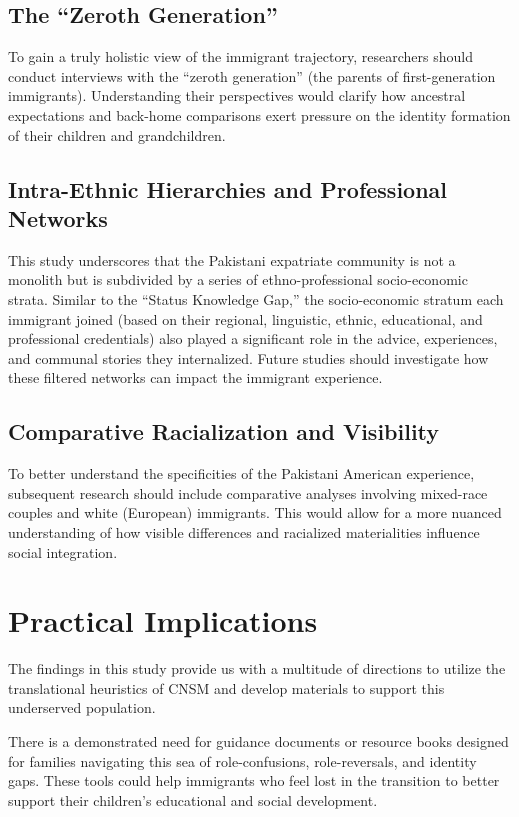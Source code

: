 \subsection{The ``Zeroth Generation''}

To gain a truly holistic view of the immigrant trajectory, researchers should conduct interviews with the “zeroth generation” (the parents of first-generation immigrants). Understanding their perspectives would clarify how ancestral expectations and back-home comparisons exert pressure on the identity formation of their children and grandchildren.

\subsection{Intra-Ethnic Hierarchies and Professional Networks}

This study underscores that the Pakistani expatriate community is not a monolith but is subdivided by a series of ethno-professional socio-economic strata. Similar to the “Status Knowledge Gap,” the socio-economic stratum each immigrant joined (based on their regional, linguistic, ethnic, educational, and professional credentials) also played a significant role in the advice, experiences, and communal stories they internalized. Future studies should investigate how these filtered networks can impact the immigrant experience.

\subsection{Comparative Racialization and Visibility}

To better understand the specificities of the Pakistani American experience, subsequent research should include comparative analyses involving mixed-race couples and white (European) immigrants. This would allow for a more nuanced understanding of how visible differences and racialized materialities influence social integration.

\section{Practical Implications}

The findings in this study provide us with a multitude of directions to utilize the translational heuristics of CNSM and develop materials to support this underserved population.

There is a demonstrated need for guidance documents or resource books designed for families navigating this sea of role-confusions, role-reversals, and identity gaps. These tools could help immigrants who feel lost in the transition to better support their children’s educational and social development.

